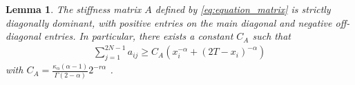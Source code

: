 \documentclass{amsart}
\newtheorem{lemma}[theorem]{Lemma}
\theoremstyle{definition}
\newtheorem{definition}[theorem]{Definition}
\theoremstyle{remark}
\numberwithin{equation}{section}
\begin{document}
\begin{lemma} \label{lmm:AisM}
  The stiffness matrix \(A\) defined by \eqref{eq:equation_matrix} is strictly diagonally dominant, with positive entries on the main diagonal and negative off-diagonal entries.
  In particular, there exists a constant \(C_A\) such that
  \begin{equation*}
    \begin{aligned}
      \sum_{j=1}^{2N-1} a_{ij}
      \ge  C_A (x_i^{-\alpha} + (2T-x_i)^{-\alpha}) 
    \end{aligned}
  \end{equation*}
  with
  $C_A = \frac{\kappa_\alpha(\alpha-1)}{\Gamma(2-\alpha)} 2^{-r\alpha}$ .
\end{lemma}
\end{document}
